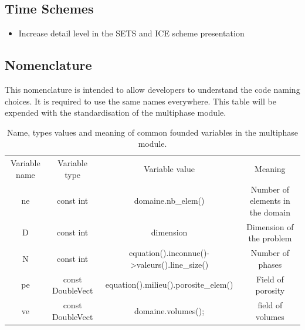 %
\subsection{Time Schemes}
\begin{itemize}
    \item Increase detail level in the SETS and ICE scheme presentation
\end{itemize}

\clearpage

\begin{landscape}
\section{Nomenclature}
This nomenclature is intended to allow developers to understand the code naming choices. It is required to use the same names everywhere. This table will be expended with the standardisation of the multiphase module.
\begin{table}[ht]
    \centering
    \begin{tabular}{cccc}
        Variable name & Variable type & Variable value & Meaning \\
        ne & const int & domaine.nb_elem() & Number of elements in the domain\\
        D & const int & dimension & Dimension of the problem\\
        N & const int & equation().inconnue()->valeurs().line_size() & Number of phases\\
        pe & const DoubleVect & equation().milieu().porosite_elem() & Field of porosity \\
        ve & const DoubleVect & domaine.volumes(); & field of volumes\\
    \end{tabular}
    \caption{Name, types values and meaning of common founded variables in the multiphase module.}
    \label{tab:my_label}
\end{table}
\end{landscape}